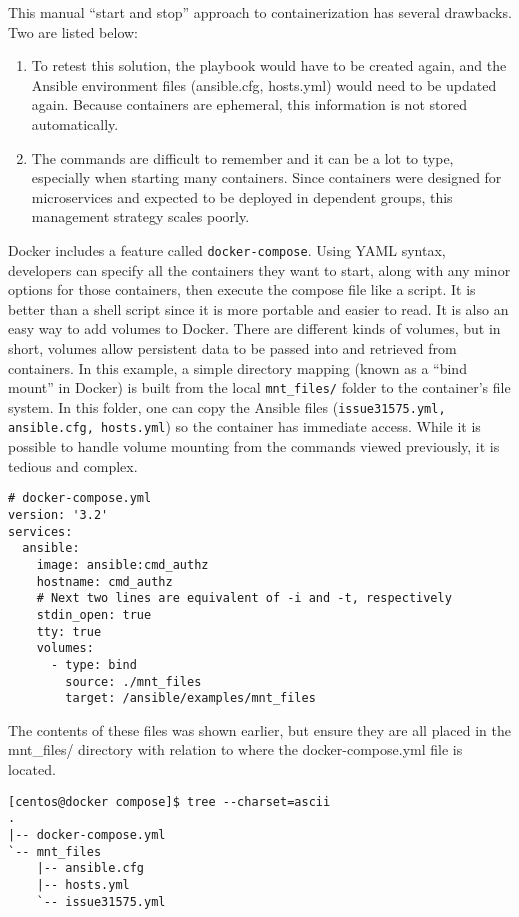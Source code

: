 This manual ``start and stop'' approach to containerization has several
drawbacks. Two are listed below:
\begin{enumerate}
  \item	To retest this solution, the playbook would have to be created again,
  and the Ansible environment files (ansible.cfg, hosts.yml) would need to be
  updated again. Because containers are ephemeral, this information is not
  stored automatically.
  \item	The commands are difficult to remember and it can be a lot to type,
  especially when starting many containers. Since containers were designed for
  microservices and expected to be deployed in dependent groups, this
  management strategy scales poorly.
\end{enumerate}
  
Docker includes a feature called \verb|docker-compose|. Using YAML syntax,
developers can specify all the containers they want to start, along with any minor
options for those containers, then execute the compose file like a script. It
is better than a shell script since it is more portable and easier to read. It
is also an easy way to add volumes to Docker. There are different kinds of
volumes, but in short, volumes allow persistent data to be passed into and
retrieved from containers. In this example, a simple directory mapping (known
as a ``bind mount'' in Docker) is built from the local \verb|mnt_files/| folder to the
container's file system. In this folder, one can copy the Ansible files
(\verb|issue31575.yml, ansible.cfg, hosts.yml|) so the container has immediate
access. While it is possible to handle volume mounting from the commands
viewed previously, it is tedious and complex.

\begin{verbatim}
# docker-compose.yml 
version: '3.2'
services:
  ansible:
    image: ansible:cmd_authz
    hostname: cmd_authz
    # Next two lines are equivalent of -i and -t, respectively
    stdin_open: true
    tty: true
    volumes:
      - type: bind
        source: ./mnt_files
        target: /ansible/examples/mnt_files
\end{verbatim}

The contents of these files was shown earlier, but ensure they are all placed
in the mnt\_files/ directory with relation to where the docker-compose.yml file
is located.

\begin{verbatim}
[centos@docker compose]$ tree --charset=ascii
.
|-- docker-compose.yml
`-- mnt_files
    |-- ansible.cfg
    |-- hosts.yml
    `-- issue31575.yml
\end{verbatim}

